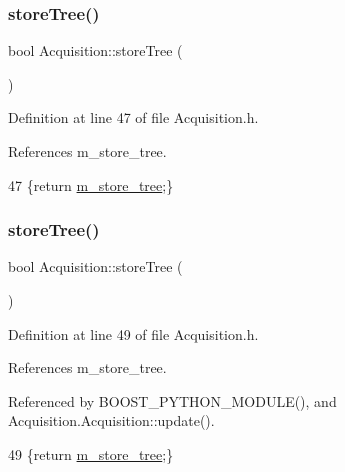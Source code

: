 \subsubsection{\texorpdfstring{store\+Tree()}{storeTree()}\hspace{0.1cm}{\footnotesize\ttfamily [1/2]}}
{\footnotesize\ttfamily bool Acquisition\+::store\+Tree (\begin{DoxyParamCaption}{ }\end{DoxyParamCaption})\hspace{0.3cm}{\ttfamily [inline]}}



Definition at line 47 of file Acquisition.\+h.



References m\+\_\+store\+\_\+tree.


\begin{DoxyCode}
47 \{\textcolor{keywordflow}{return} \hyperlink{classAcquisition_aca2143e9135e25554e58327475a767c5}{m\_store\_tree};\}
\end{DoxyCode}
\mbox{\label{classAcquisition_a8ab7e58ccb3fee54eb6850e5081fae10}} 
\subsubsection{\texorpdfstring{store\+Tree()}{storeTree()}\hspace{0.1cm}{\footnotesize\ttfamily [2/2]}}
{\footnotesize\ttfamily bool Acquisition\+::store\+Tree (\begin{DoxyParamCaption}{ }\end{DoxyParamCaption})\hspace{0.3cm}{\ttfamily [inline]}}



Definition at line 49 of file Acquisition.\+h.



References m\+\_\+store\+\_\+tree.



Referenced by B\+O\+O\+S\+T\+\_\+\+P\+Y\+T\+H\+O\+N\+\_\+\+M\+O\+D\+U\+L\+E(), and Acquisition.\+Acquisition\+::update().


\begin{DoxyCode}
49 \{\textcolor{keywordflow}{return} \hyperlink{classAcquisition_aca2143e9135e25554e58327475a767c5}{m\_store\_tree};\}
\end{DoxyCode}
\mbox{\label{classAcquisition_a5af693448daef6e9e054ab7f1aa50784}} 
